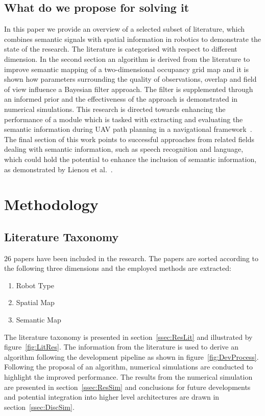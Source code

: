 \documentclass[twocolumn,letterpaper]{IEEEAerospaceCLS}  %
\begin{document}
\subsection{What do we propose for solving it}
In this paper we provide an overview of a selected subset of literature, which combines semantic signals with spatial information in robotics to demonstrate the state of the research. The literature is categorised with respect to different dimension. In the second section an algorithm is derived from the literature to improve semantic mapping of a two-dimensional occupancy grid map and it is shown how parameters surrounding the quality of observations, overlap and field of view influence a Bayesian filter approach. The filter is supplemented through an informed prior and the effectiveness of the approach is demonstrated in numerical simulations. This research is directed towards enhancing the performance of a module which is tasked with extracting and evaluating the semantic information during UAV path planning in a navigational framework~\cite{mandel_towards_2020}. The final section of this work points to successful approaches from related fields dealing with semantic information, such as speech recognition and language, which could hold the potential to enhance the inclusion of semantic information, as demonstrated by Lienou et al.~\cite{lienou_semantic_2010}.
\section{Methodology} \label{sec:Met}
\subsection{Literature Taxonomy} \label{ssec:MetLit}
$26$ papers have been included in the research. The papers are sorted according to the following three dimensions and the employed methods are extracted:
\begin{enumerate}
    \item Robot Type
    \item Spatial Map
    \item Semantic Map
\end{enumerate}
The literature taxonomy is presented in section~\ref{ssec:ResLit} and illustrated by figure~\ref{fig:LitRes}. The information from the literature is used to derive an algorithm following the development pipeline as shown in figure~\ref{fig:DevProcess}. Following the proposal of an algorithm, numerical simulations are conducted to highlight the improved performance. The results from the numerical simulation are presented in section~\ref{ssec:ResSim} and conclusions for future developments and potential integration into higher level architectures are drawn in section~\ref{ssec:DiscSim}.
\end{document}
